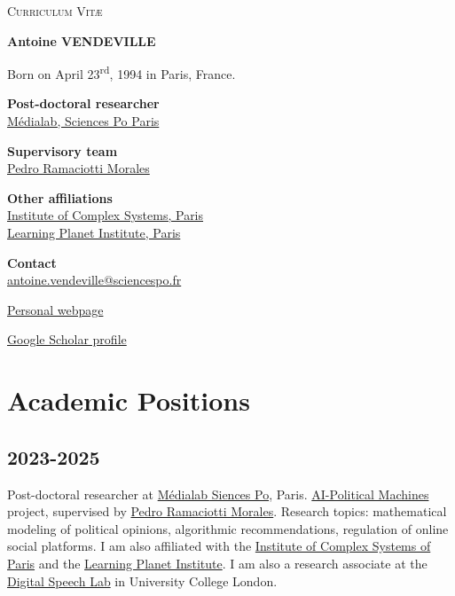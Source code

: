 \documentclass[a4paper,12pt]{article}
\begin{document}
\bigskip
\begin{center}
\LARGE\textsc{Curriculum Vit\ae}

\medskip

\end{center}
\bigskip

\bigskip
\bigskip

\thispagestyle{empty} %
 
{\large\textbf{Antoine VENDEVILLE}}
\vspace{1cm}

Born on April 23\textsuperscript{rd}, 1994 in Paris, France.

\medskip

\textbf{Post-doctoral researcher}\\ 
\href{https://medialab.sciencespo.fr/en/}{Médialab, 
Sciences Po Paris}

\medskip
\textbf{Supervisory team}\\
\href{https://pedroramaciotti.github.io/}{Pedro Ramaciotti Morales}

\medskip

\textbf{Other affiliations}\\
\href{https://iscpif.fr/?lang=en}{Institute of Complex Systems, Paris}\\
\href{https://www.learningplanetinstitute.org/en/}{Learning Planet Institute, Paris}\\
\medskip

\textbf{Contact}\\
  \href{mailto:antoine.vendeville@sciencespo.fr}{antoine.vendeville@sciencespo.fr}

  \href{https://antoinevendeville.github.io}{Personal webpage}

  \href{https://scholar.google.com/citations?user=D7pFu_8AAAAJ&hl=fr}{Google Scholar profile}


\renewcommand{\baselinestretch}{1.0}

\section*{Academic Positions}
\subsection*{2023-2025} 
Post-doctoral researcher at \href{https://medialab.sciencespo.fr/}{Médialab Siences Po}, Paris. \href{https://medialab.sciencespo.fr/activites/ai-political-machine/}{AI-Political Machines} project, supervised by \href{https://pedroramaciotti.github.io/}{Pedro Ramaciotti Morales}. Research topics: mathematical modeling of political opinions, algorithmic recommendations, regulation of online social platforms. I am also affiliated with the \href{https://iscpif.fr/?lang=en}{Institute of Complex Systems of Paris} and the \href{https://www.learningplanetinstitute.org/en/}{Learning Planet Institute}. I am also a research associate at the \href{https://www.digitalspeechlab.com/}{Digital Speech Lab} in University College London.
\end{document}
